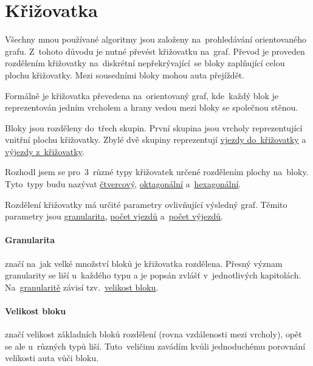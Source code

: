 \section{Křižovatka}\label{sec:krizovatka}

%


Všechny mnou používané algoritmy jsou založeny na~prohledávání orientovaného grafu.
Z~tohoto důvodu je nutné převést křižovatku na~graf.
Převod je proveden rozdělením křižovatky na~diskrétní nepřekrývající~se bloky zaplňující celou plochu křižovatky.
Mezi sousedními bloky mohou auta přejíždět.

Formálně je křižovatka převedena na~orientovaný graf,
kde~každý blok je reprezentován jedním vrcholem a hrany vedou mezi bloky se společnou stěnou.

Bloky jsou rozděleny do~třech skupin.
První skupina jsou vrcholy reprezentující vnitřní plochu křižovatky.
Zbylé dvě skupiny reprezentují \hyperref[par:vjezdy]{vjezdy do~křižovatky} a \hyperref[par:vyjezdy]{výjezdy z~křižovatky}.

Rozhodl jsem se pro~$3$~různé typy křižovatek určené rozdělením plochy na~bloky.
Tyto~typy budu nazývat \hyperref[subsec:ctvercovy_typ]{čtvercový}, \hyperref[subsec:oktagonalni_typ]{oktagonální}
a~\hyperref[subsec:hexagonalni_typ]{hexagonální}.

Rozdělení křižovatky má určité parametry ovlivňující výsledný graf.
Těmito parametry jsou \hyperref[par:granularita]{granularita},
\hyperref[par:vjezdy]{počet vjezdů} a~\hyperref[par:vyjezdy]{počet výjezdů}.

\paragraph{Granularita}\label{par:granularita} značí na~jak velké množství bloků je křižovatka rozdělena.
Přesný význam granularity se liší u~každého typu a je popsán zvlášť v~jednotlivých kapitolách.
Na~\hyperref[par:granularita]{granularitě} závisí tzv.~\hyperref[par:velikost_bloku]{velikost bloku}.

\paragraph{Velikost bloku}\label{par:velikost_bloku} značí velikost základních bloků rozdělení
(rovna vzdálenosti mezi vrcholy), opět se ale u~různých typů liší.
Tuto~veličinu zavádím kvůli jednoduchému porovnání velikosti auta vůči bloku.


